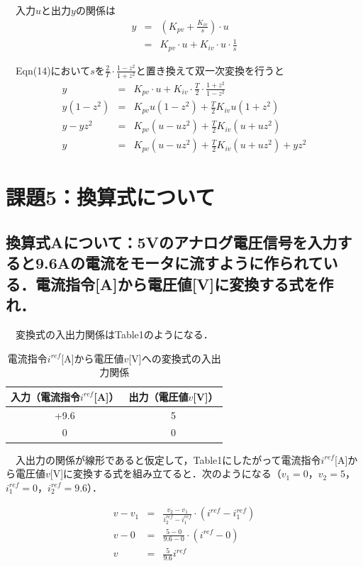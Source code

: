 　入力$u$と出力$y$の関係は
\begin{eqnarray}
    y &=& \left(K_{pv} + \frac{K_{iv}}{s} \right) \cdot u \nonumber \\
      &=& K_{pv} \cdot u + K_{iv} \cdot u \cdot \frac{1}{s}
\end{eqnarray}

　Eqn(14)において$s$を$\frac{2}{T} \cdot \frac{1-z^2}{1+z^2}$と置き換えて双一次変換を行うと
\begin{eqnarray}
    y &=& K_{pv} \cdot u + K_{iv} \cdot \frac{T}{2} \cdot \frac{1+z^2}{1-z^2} \nonumber \\
    y (1-z^2) &=& K_{pv}u(1-z^2) + \frac{T}{2} K_{iv} u (1+z^2) \nonumber \\
    y - yz^2 &=& K_{pv}(u - uz^2) + \frac{T}{2} K_{iv} (u + uz^2) \nonumber \\
    y &=& K_{pv}(u - uz^2) + \frac{T}{2} K_{iv} (u + uz^2) + yz^2
\end{eqnarray}


\section{課題5：換算式について}
\subsection{換算式Aについて：5Vのアナログ電圧信号を入力すると9.6Aの電流をモータに流すように作られている．電流指令[A]から電圧値[V]に変換する式を作れ．}
　変換式の入出力関係はTable1のようになる．
\begin{table}[hbtp]
    \caption{電流指令$i^{ref}$[A]から電圧値$v$[V]への変換式の入出力関係}
    \centering
    \begin{tabular}{cc}
    \hline
    入力（電流指令$i^{ref}$[A]）  & 出力（電圧値$v$[V]） \\
    \hline \hline
    +9.6 & 5  \\
    0    & 0  \\
    \hline
    \end{tabular}
\end{table}

　入出力の関係が線形であると仮定して，Table1にしたがって電流指令$i^{ref}$[A]から電圧値$v$[V]に変換する式を組み立てると．次のようになる（$v_1 = 0$，$v_2 = 5$，$i^{ref}_1 = 0$，$i^{ref}_2 = 9.6$）．

\begin{eqnarray}
    v - v_1 &=& \frac{v_2 - v_1}{i^{ref}_2 - i^{ref}_1} \cdot \left(i^{ref} - i^{ref}_1 \right) \nonumber \\
    v - 0 &=& \frac{5 - 0}{9.6 - 0}\cdot \left(i^{ref} - 0 \right) \nonumber \\
    v  &=& \frac{5}{9.6}i^{ref}
\end{eqnarray}


